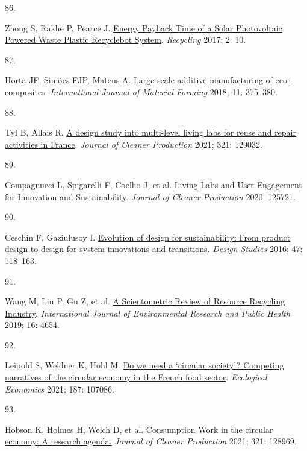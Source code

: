 \documentclass[
  11pt,
  a4paperpaper,
  onecolumn]{article}
\newlength{\cslhangindent}
\newlength{\csllabelwidth}
\newlength{\cslentryspacingunit} %
\newenvironment{CSLReferences}[2] %
 {%
  \setlength{\parindent}{0pt}
  \ifodd #1
  \let\oldpar\par
  \def\par{\hangindent=\cslhangindent\oldpar}
  \fi
  \setlength{\parskip}{#2\cslentryspacingunit}
 }%
 {}
\newcommand{\CSLLeftMargin}[1]{\parbox[t]{\csllabelwidth}{#1}}
\newcommand{\CSLRightInline}[1]{\parbox[t]{\linewidth - \csllabelwidth}{#1}\break}
\begin{document}
\begin{CSLReferences}{0}{0}
\leavevmode{}%
\CSLLeftMargin{86. }%
\CSLRightInline{Zhong S, Rakhe P, Pearce J.
\href{https://doi.org/10.3390/recycling2020010}{Energy {Payback Time} of
a {Solar Photovoltaic Powered Waste Plastic Recyclebot System}}.
\emph{Recycling} 2017; 2: 10.}

\leavevmode{}%
\CSLLeftMargin{87. }%
\CSLRightInline{Horta JF, Simões FJP, Mateus A.
\href{https://doi.org/10.1007/s12289-017-1364-5}{Large scale additive
manufacturing of eco-composites}. \emph{International Journal of
Material Forming} 2018; 11: 375--380.}

\leavevmode{}%
\CSLLeftMargin{88. }%
\CSLRightInline{Tyl B, Allais R.
\href{https://doi.org/10.1016/J.JCLEPRO.2021.129032}{A design study into
multi-level living labs for reuse and repair activities in {France}}.
\emph{Journal of Cleaner Production} 2021; 321: 129032.}

\leavevmode{}%
\CSLLeftMargin{89. }%
\CSLRightInline{Compagnucci L, Spigarelli F, Coelho J, et al.
\href{https://doi.org/10.1016/j.jclepro.2020.125721}{Living {Labs} and
{User Engagement} for {Innovation} and {Sustainability}}. \emph{Journal
of Cleaner Production} 2020; 125721.}

\leavevmode{}%
\CSLLeftMargin{90. }%
\CSLRightInline{Ceschin F, Gaziulusoy I.
\href{https://doi.org/10.1016/j.destud.2016.09.002}{Evolution of design
for sustainability: {From} product design to design for system
innovations and transitions}. \emph{Design Studies} 2016; 47: 118--163.}

\leavevmode{}%
\CSLLeftMargin{91. }%
\CSLRightInline{Wang M, Liu P, Gu Z, et al.
\href{https://doi.org/10.3390/ijerph16234654}{A {Scientometric Review}
of {Resource Recycling Industry}}. \emph{International Journal of
Environmental Research and Public Health} 2019; 16: 4654.}

\leavevmode{}%
\CSLLeftMargin{92. }%
\CSLRightInline{Leipold S, Weldner K, Hohl M.
\href{https://doi.org/10.1016/j.ecolecon.2021.107086}{Do we need a
{`circular society'}? {Competing} narratives of the circular economy in
the {French} food sector}. \emph{Ecological Economics} 2021; 187:
107086.}

\leavevmode{}%
\CSLLeftMargin{93. }%
\CSLRightInline{Hobson K, Holmes H, Welch D, et al.
\href{https://doi.org/10.1016/J.JCLEPRO.2021.128969}{Consumption {Work}
in the circular economy: {A} research agenda.} \emph{Journal of Cleaner
Production} 2021; 321: 128969.}


\end{CSLReferences}
\end{document}

